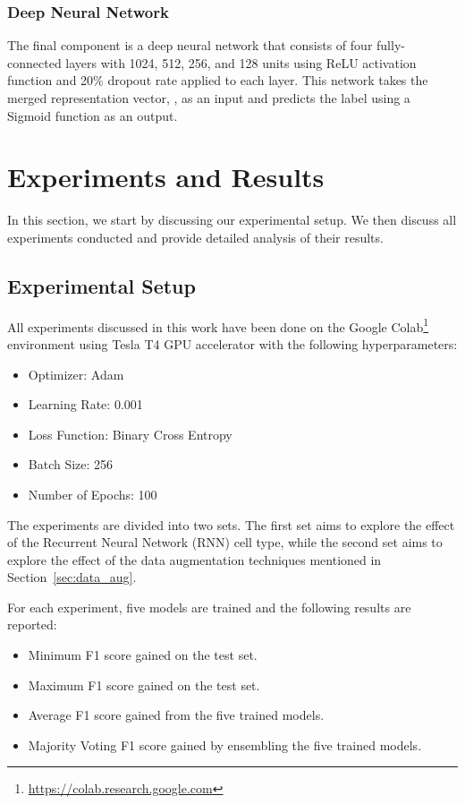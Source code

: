 \documentclass[11pt,a4paper]{article}
\begin{document}
\subsubsection{Deep Neural Network}
The final component is a deep neural network that consists of four fully-connected layers with 1024, 512, 256, and 128 units using ReLU activation function and 20\% dropout rate applied to each layer. This network takes the merged representation vector, , as an input and predicts the label using a Sigmoid function as an output.

\section{Experiments and Results}
\label{sec:result}

In this section, we start by discussing our experimental setup. We then discuss all experiments conducted and provide detailed analysis of their results.

\subsection{Experimental Setup}

All experiments discussed in this work have been done on the Google Colab\footnote{\url{https://colab.research.google.com}} \cite{carneiro2018performance} environment using Tesla T4 GPU accelerator with the following hyperparameters:
\begin{itemize}
  \item Optimizer: Adam
  \item Learning Rate: 0.001
  \item Loss Function: Binary Cross Entropy
  \item Batch Size: 256
  \item Number of Epochs: 100
\end{itemize}

The experiments are divided into two sets. The first set aims to explore the effect of the Recurrent Neural Network (RNN) cell type, while the second set aims to explore the effect of the data augmentation techniques mentioned in Section~\ref{sec:data_aug}.

For each experiment, five models are trained and the following results are reported:
\begin{itemize}
  \item Minimum F1 score gained on the test set.
  \item Maximum F1 score gained on the test set.
  \item Average F1 score gained from the five trained models.
  \item Majority Voting F1 score gained by ensembling the five trained models.
\end{itemize}
\end{document}

